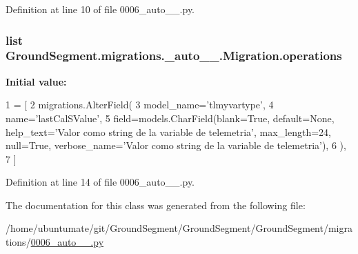 Definition at line 10 of file 0006\+\_\+auto\+\_\+\_.\+py.

\hypertarget{class_ground_segment_1_1migrations_1_10006__auto__20161126__1611_1_1_migration_abaff5718aa39d36cbbce875a7f90a622}{}
\subsubsection[{operations}]{\setlength{\rightskip}{0pt plus 5cm}list Ground\+Segment.\+migrations.\+\_\+auto\+\_\+\_.\+Migration.\+operations\hspace{0.3cm}{\ttfamily [static]}}\label{class_ground_segment_1_1migrations_1_10006__auto__20161126__1611_1_1_migration_abaff5718aa39d36cbbce875a7f90a622}
{\bfseries Initial value\+:}
\begin{DoxyCode}
1 = [
2         migrations.AlterField(
3             model\_name=\textcolor{stringliteral}{'tlmyvartype'},
4             name=\textcolor{stringliteral}{'lastCalSValue'},
5             field=models.CharField(blank=\textcolor{keyword}{True}, default=\textcolor{keywordtype}{None}, help\_text=\textcolor{stringliteral}{'Valor como string de la variable de
       telemetria'}, max\_length=24, null=\textcolor{keyword}{True}, verbose\_name=\textcolor{stringliteral}{'Valor como string de la variable de telemetria'}),
6         ),
7     ]
\end{DoxyCode}


Definition at line 14 of file 0006\+\_\+auto\+\_\+\_.\+py.



The documentation for this class was generated from the following file\+:\begin{DoxyCompactItemize}
\item 
/home/ubuntumate/git/\+Ground\+Segment/\+Ground\+Segment/\+Ground\+Segment/migrations/\hyperlink{0006__auto__20161126__1611_8py}{0006\+\_\+auto\+\_\+\_.\+py}\end{DoxyCompactItemize}
